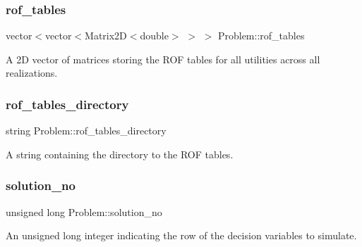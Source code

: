 \subsubsection{\texorpdfstring{rof\+\_\+tables}{rof\_tables}}
{\footnotesize\ttfamily vector$<$vector$<$Matrix2D$<$double$>$ $>$ $>$ Problem\+::rof\+\_\+tables\hspace{0.3cm}{\ttfamily [protected]}}



A 2D vector of matrices storing the R\+OF tables for all utilities across all realizations. 

\mbox{\label{classProblem_abc641b49a4defb0dbabafbf3f9dbca6e}} 
\subsubsection{\texorpdfstring{rof\+\_\+tables\+\_\+directory}{rof\_tables\_directory}}
{\footnotesize\ttfamily string Problem\+::rof\+\_\+tables\+\_\+directory\hspace{0.3cm}{\ttfamily [protected]}}



A string containing the directory to the R\+OF tables. 

\mbox{\label{classProblem_a7ca15cdcbff926ddca25bdee5984ffe5}} 
\subsubsection{\texorpdfstring{solution\+\_\+no}{solution\_no}}
{\footnotesize\ttfamily unsigned long Problem\+::solution\+\_\+no\hspace{0.3cm}{\ttfamily [protected]}}



An unsigned long integer indicating the row of the decision variables to simulate. 

\mbox{\label{classProblem_a27cae146b3409021f6d5936404cd1083}} 
